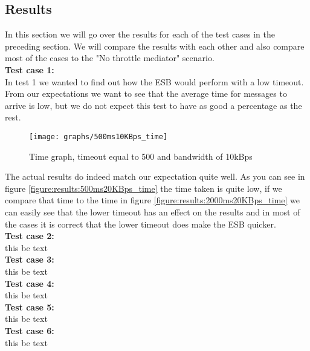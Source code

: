\subsection{Results}\label{Testing:Results}
	In this section we will go over the results for each of the test cases in the preceding section. We will compare the results with each other and also compare most of the cases to the "No throttle mediator" scenario.\\
	 
    \textbf{Test case 1:}\\
    In test 1 we wanted to find out how the ESB would perform with a low timeout. From our expectations we want to see that the average time for messages to arrive is low, but we do not expect this test to have as good a percentage as the rest. 
    
	\begin{figure}[H]
		\centering
		\texttt{[image: graphs/500ms10KBps\_time]}
		\caption{Time graph, timeout equal to 500 and bandwidth of 10kBps} 
		\label{figure:results:500ms10KBps_time}
	\end{figure}
    
    The actual results do indeed match our expectation quite well. As you can see in figure \ref{figure:results:500ms20KBps_time} the time taken is quite low, if we compare that time to the time in figure \ref{figure:results:2000ms20KBps_time} we can easily see that the lower timeout has an effect on the results and in most of the cases it is correct that the lower timeout does make the ESB quicker.\\
    
    \textbf{Test case 2:}\\
    this be text\\
    
    \textbf{Test case 3:}\\
    this be text\\
    
    \textbf{Test case 4:}\\
    this be text\\
    
    \textbf{Test case 5:}\\
    this be text\\
    
    \textbf{Test case 6:}\\
    this be text\\
